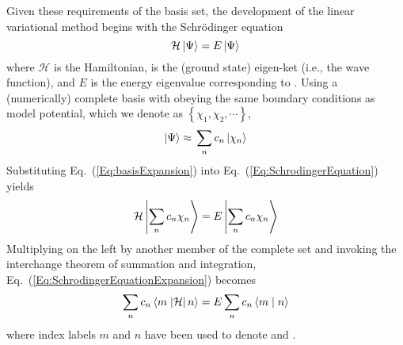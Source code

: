 Given these requirements of the basis set, the development of the linear variational method begins with the Schr\"{o}dinger equation
%
\begin{equation}\label{Eq:SchrodingerEquation}
\displaystyle
  \mathcal{H}\left| \Psi \right\rangle = E\left| \Psi \right\rangle
\end{equation}
%
where $\mathcal{H}$ is the Hamiltonian, \ket{\Psi} is the (ground state) eigen-ket (i.e., the wave function), and $E$ is the energy eigenvalue corresponding to \ket{\Psi}. Using a (numerically) complete basis with obeying the same boundary conditions as model potential, which we denote as $\left\{\chi_1, \chi_2, \cdots{}\right\}$, 
%
\begin{equation}\label{Eq:basisExpansion}
\displaystyle
  \left| \Psi \right\rangle \approx{} \sum_n{c_n\left| \chi_n \right\rangle}
\end{equation}
%
Substituting Eq.~(\ref{Eq:basisExpansion}) into Eq.~(\ref{Eq:SchrodingerEquation}) yields
%
\begin{equation}\label{Eq:SchrodingerEquationExpansion}
\displaystyle
  \mathcal{H}\left| \sum_n{c_n\chi_n} \right\rangle = E\left| \sum_n{c_n\chi_n} \right\rangle
\end{equation}
%
Multiplying on the left by another member of the complete set and invoking the interchange theorem of summation and integration, Eq.~(\ref{Eq:SchrodingerEquationExpansion}) becomes
%
\begin{equation}\label{Eq:SchrodingerEquationMatrix1}
\displaystyle
  \sum_n{c_n \braketop{m}{\mathcal{H}}{n}} = E\sum_n{c_n\braket{m}{n}}
\end{equation}
%
where index labels $m$ and $n$ have been used to denote  and .

